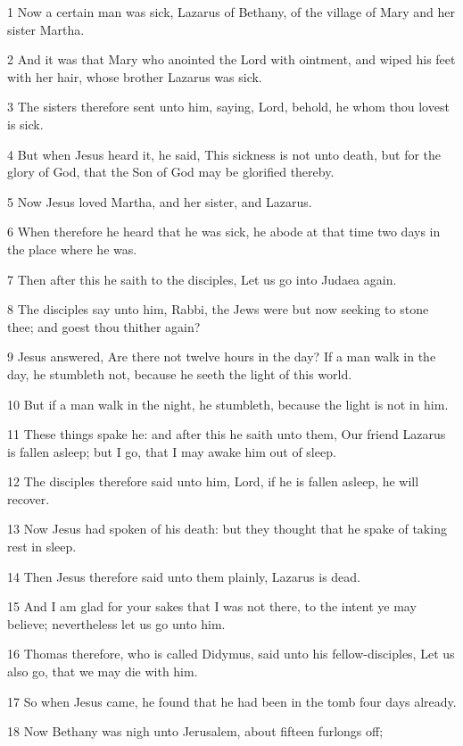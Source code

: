 \par 1 Now a certain man was sick, Lazarus of Bethany, of the village of Mary and her sister Martha.
\par 2 And it was that Mary who anointed the Lord with ointment, and wiped his feet with her hair, whose brother Lazarus was sick.
\par 3 The sisters therefore sent unto him, saying, Lord, behold, he whom thou lovest is sick.
\par 4 But when Jesus heard it, he said, This sickness is not unto death, but for the glory of God, that the Son of God may be glorified thereby.
\par 5 Now Jesus loved Martha, and her sister, and Lazarus.
\par 6 When therefore he heard that he was sick, he abode at that time two days in the place where he was.
\par 7 Then after this he saith to the disciples, Let us go into Judaea again.
\par 8 The disciples say unto him, Rabbi, the Jews were but now seeking to stone thee; and goest thou thither again?
\par 9 Jesus answered, Are there not twelve hours in the day? If a man walk in the day, he stumbleth not, because he seeth the light of this world.
\par 10 But if a man walk in the night, he stumbleth, because the light is not in him.
\par 11 These things spake he: and after this he saith unto them, Our friend Lazarus is fallen asleep; but I go, that I may awake him out of sleep.
\par 12 The disciples therefore said unto him, Lord, if he is fallen asleep, he will recover.
\par 13 Now Jesus had spoken of his death: but they thought that he spake of taking rest in sleep.
\par 14 Then Jesus therefore said unto them plainly, Lazarus is dead.
\par 15 And I am glad for your sakes that I was not there, to the intent ye may believe; nevertheless let us go unto him.
\par 16 Thomas therefore, who is called Didymus, said unto his fellow-disciples, Let us also go, that we may die with him.
\par 17 So when Jesus came, he found that he had been in the tomb four days already.
\par 18 Now Bethany was nigh unto Jerusalem, about fifteen furlongs off;
